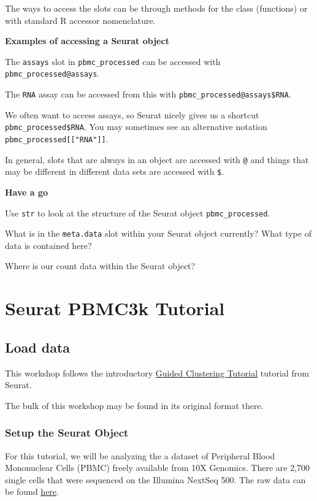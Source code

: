 \documentclass[
]{book}
\begin{document}
The ways to access the slots can be through methods for the class (functions) or with standard R accessor nomenclature.

\textbf{Examples of accessing a Seurat object}

The \texttt{assays} slot in \texttt{pbmc\_processed} can be accessed with \texttt{pbmc\_processed@assays}.

The \texttt{RNA} assay can be accessed from this with \texttt{pbmc\_processed@assays\$RNA}.

We often want to access assays, so Seurat nicely gives us a shortcut \texttt{pbmc\_processed\$RNA}. You may sometimes see an alternative notation \texttt{pbmc\_processed{[}{[}"RNA"{]}{]}}.

In general, slots that are always in an object are accessed with \texttt{@} and things that may be different in different data sets are accessed with \texttt{\$}.

\textbf{Have a go}

Use \texttt{str} to look at the structure of the Seurat object \texttt{pbmc\_processed}.

What is in the \texttt{meta.data} slot within your Seurat object currently? What type of data is contained here?

Where is our count data within the Seurat object?

\hypertarget{part-seurat-pbmc3k-tutorial}{%
\part{Seurat PBMC3k Tutorial}\label{part-seurat-pbmc3k-tutorial}}

\hypertarget{load}{%
\chapter{Load data}\label{load}}

This workshop follows the introductory \href{https://satijalab.org/seurat/articles/pbmc3k_tutorial.html}{Guided Clustering Tutorial} tutorial from Seurat.

The bulk of this workshop may be found in its original format there.

\hypertarget{setup-the-seurat-object}{%
\section{Setup the Seurat Object}\label{setup-the-seurat-object}}

For this tutorial, we will be analyzing the a dataset of Peripheral Blood Mononuclear Cells (PBMC) freely available from 10X Genomics. There are 2,700 single cells that were sequenced on the Illumina NextSeq 500. The raw data can be found \href{https://cf.10xgenomics.com/samples/cell/pbmc3k/pbmc3k_filtered_gene_bc_matrices.tar.gz}{here}.
\end{document}
